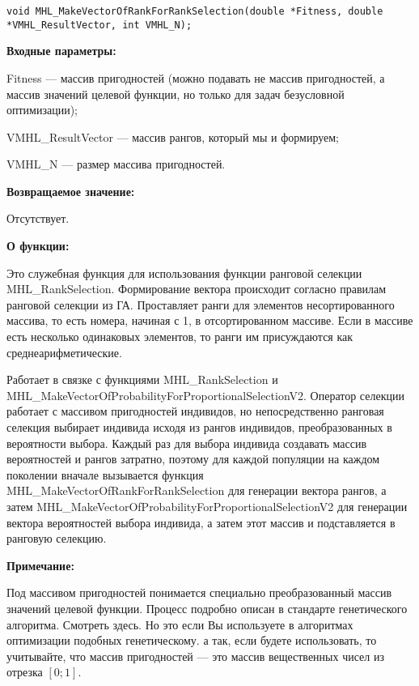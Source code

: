 \documentclass[a4paper,12pt]{article}
\begin{document}
\begin{lstlisting}[label=code_syntax_MHL_MakeVectorOfRankForRankSelection,caption=Синтаксис]
void MHL_MakeVectorOfRankForRankSelection(double *Fitness, double *VMHL_ResultVector, int VMHL_N);
\end{lstlisting}

\textbf{Входные параметры:}

Fitness --- массив пригодностей (можно подавать не массив пригодностей, а массив значений целевой функции, но только для задач безусловной оптимизации);
 
VMHL\_ResultVector --- массив рангов, который мы и формируем;
 
VMHL\_N --- размер массива пригодностей.

\textbf{Возвращаемое значение:} 
 
Отсутствует.
 
\textbf{О функции:}

Это служебная функция для использования функции ранговой селекции MHL\_RankSelection. Формирование вектора происходит согласно правилам ранговой селекции из ГА. Проставляет ранги для элементов несортированного массива, то есть номера, начиная с 1, в отсортированном массиве. Если в массиве есть несколько одинаковых элементов, то ранги им присуждаются как среднеарифметические.

Работает в связке с функциями MHL\_RankSelection и MHL\_MakeVectorOfProbabilityForProportionalSelectionV2. Оператор селекции работает с массивом пригодностей индивидов, но непосредственно ранговая селекция выбирает индивида исходя из рангов индивидов, преобразованных в вероятности выбора. Каждый раз для выбора индивида создавать массив вероятностей и рангов затратно, поэтому для каждой популяции на каждом поколении вначале вызывается функция MHL\_MakeVectorOfRankForRankSelection для генерации вектора рангов, а затем MHL\_MakeVectorOfProbabilityForProportionalSelectionV2 для генерации вектора вероятностей выбора индивида, а затем этот массив и подставляется в ранговую селекцию.

\textbf{Примечание:}

 Под массивом пригодностей понимается специально преобразованный массив значений целевой функции. Процесс подробно описан в стандарте генетического алгоритма. Смотреть здесь. Но это если Вы используете в алгоритмах оптимизации подобных генетическому. а так, если будете использовать, то учитывайте, что массив пригодностей --- это массив вещественных чисел из отрезка $[0;1]$.
\end{document}
